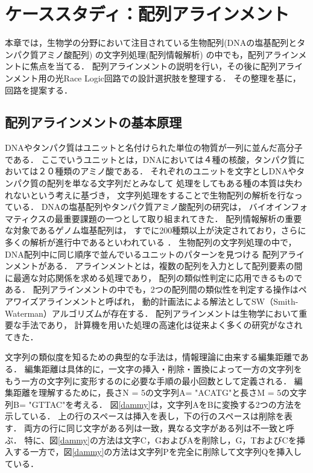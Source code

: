 \chapter{ケーススタディ：配列アラインメント}
本章では，生物学の分野において注目されている生物配列(DNAの塩基配列とタンパク質アミノ酸配列) の文字列処理(配列情報解析) 
\cite{浅井潔2000配列情報と確立モデル,後藤修1998マルチプルアラインメントは生体高分子情報の交差点}の中でも，配列アラインメントに焦点を当てる．
配列アラインメントの説明を行い，その後に配列アラインメント用の光Race Logic回路での設計選択肢を整理する．
その整理を基に，回路を提案する．

\section{配列アラインメントの基本原理}
DNAやタンパク質はユニットと名付けられた単位の物質が一列に並んだ高分子である．
ここでいうユニットとは，DNAにおいては４種の核酸，タンパク質においては２０種類のアミノ酸である．
それぞれのユニットを文字としDNAやタンパク質の配列を単なる文字列だとみなして
処理をしてもある種の本質は失われないという考えに基づき，
文字列処理をすることで生物配列の解析を行なっている．
DNAの塩基配列やタンパク質アミノ酸配列の研究は，
バイオインフォマティクスの最重要課題の一つとして取り組まれてきた．
配列情報解析の重要な対象であるゲノム塩基配列は，
すでに200種類以上が決定されており，さらに多くの解析が進行中であるといわれている
\cite{浅井潔2005バイオインフォマティクス}．
生物配列の文字列処理の中で，DNA配列中に同じ順序で並んでいるユニットのパターンを見つける
配列アラインメントがある\cite{須戸里織2011バイオインフォマティクスゲノム配列から機能解析へバイオインフォマティクスゲノム配列から機能解析へ}．
アラインメントとは，複数の配列を入力として配列要素の間に最適な対応関係を求める処理であり，
配列の類似性判定に応用できるものである．
配列アラインメントの中でも，2つの配列間の類似性を判定する操作はペアワイズアラインメントと呼ばれ，
動的計画法による解法としてSW（Smith-Waterman）アルゴリズム\cite{smith1981identification}が存在する．
配列アラインメントは生物学において重要な手法であり，
計算機を用いた処理の高速化は従来よく多くの研究がなされてきた\cite{須戸里織2011gpu,宗川裕馬2008統合開発環境,sandes2011smith,liu2015accelerating,伊野文彦2007gpu}．

文字列の類似度を知るための典型的な手法は，情報理論に由来する編集距離である．
編集距離は具体的に，一文字の挿入・削除・置換によって一方の文字列をもう一方の文字列に変形するのに必要な手順の最小回数として定義される．
編集距離を理解するために，長さN = 5の文字列A= "ACATG"と長さM = 5の文字列B= "GTTAC"を考える．
図\ref{dammy}は，文字列AをBに変換する2つの方法を示している．
上の行のスペースは挿入を表し，下の行のスペースは削除を表す．
両方の行に同じ文字がある列は一致，異なる文字がある列は不一致と呼ぶ．
特に、図\ref{dammy}の方法は文字C，GおよびAを削除し，G，TおよびCを挿入する一方で，図\ref{dammy}の方法は文字列Pを完全に削除して文字列Qを挿入している．

